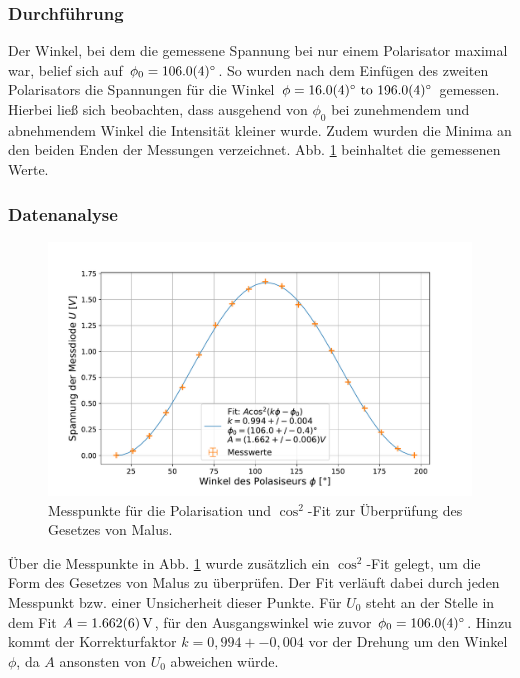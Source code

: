 		\subsubsection*{Durchführung}
		
			Der Winkel, bei dem die gemessene Spannung bei nur einem Polarisator maximal war, belief sich auf $\phi_0 = \SI{106+-0,4}{\degree}$.
			So wurden nach dem Einfügen des zweiten Polarisators die Spannungen für die Winkel $\phi = \SIrange{16+-0,4}{196+-0,4}{\degree}$ gemessen.
			Hierbei ließ sich beobachten, dass ausgehend von $\phi_0$ bei zunehmendem und abnehmendem Winkel die Intensität kleiner wurde.
			Zudem wurden die Minima an den beiden Enden der Messungen verzeichnet.
			Abb. \ref{fig:PolarisationFit} beinhaltet die gemessenen Werte.
		
		\subsubsection*{Datenanalyse}
			
			\begin{figure}[ht]
				\centering
				\includegraphics[width=\textwidth]{data/laserPolarisation.pdf}
				\caption{Messpunkte für die Polarisation und $\cos^2$-Fit zur Überprüfung des Gesetzes von Malus.}
				\label{fig:PolarisationFit}	
			\end{figure}
			Über die Messpunkte in Abb. \ref{fig:PolarisationFit} wurde zusätzlich ein $\cos^2$-Fit gelegt, um die Form des Gesetzes von Malus zu überprüfen.
			Der Fit verläuft dabei durch jeden Messpunkt bzw. einer Unsicherheit dieser Punkte.
			Für $U_0$ steht an der Stelle in dem Fit $A = \SI{1,662+-0,006}{\volt}$, für den Ausgangswinkel wie zuvor $\phi_0 = \SI{106+-0,4}{\degree}$.
			Hinzu kommt der Korrekturfaktor $k=0,994+-0,004$ vor der Drehung um den Winkel $\phi$, da $A$ ansonsten von $U_0$ abweichen würde.
		

